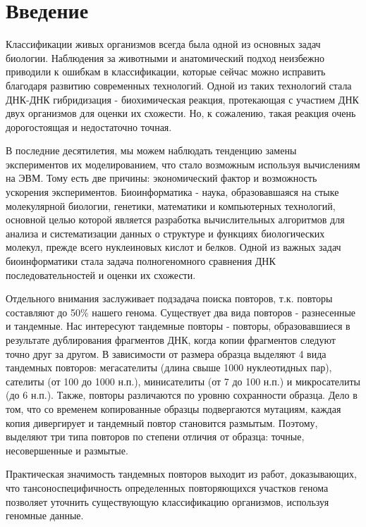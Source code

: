 \chapter*{Введение}							%

Классификации живых организмов всегда была одной из основных задач биологии.
Наблюдения за животными и анатомический подход неизбежно приводили к ошибкам
в классификации, которые сейчас можно исправить благодаря развитию современных
технологий. Одной из таких технологий стала ДНК-ДНК гибридизация - биохимическая реакция,
протекающая с участием ДНК двух организмов для оценки их схожести. Но, к сожалению,
такая реакция очень дорогостоящая и недостаточно точная.

В последние десятилетия, мы можем наблюдать тенденцию замены экспериментов
их моделированием, что стало возможным используя вычислениям на ЭВМ. Тому есть
две причины: экономический фактор и возможность ускорения экспериментов.
Биоинформатика - наука, образовавшаяся на стыке молекулярной биологии, генетики,
математики и компьютерных технологий, основной целью которой является разработка
вычислительных алгоритмов для анализа и систематизации данных о структуре и
функциях биологических молекул, прежде всего нуклеиновых кислот и белков.
Одной из важных задач биоинформатики стала задача полногеномного сравнения ДНК
последовательностей и оценки их схожести.

Отдельного внимания заслуживает подзадача поиска повторов, т.к. повторы составляют
до 50\% нашего генома. Существует два вида повторов - разнесенные и тандемные.
Нас интересуют тандемные повторы - повторы, образовавшиеся в результате дублирования
фрагментов ДНК, когда копии фрагментов следуют точно друг за другом.
В зависимости от размера образца выделяют 4 вида тандемных повторов: мегасателиты
(длина свыше 1000 нуклеотидных пар), сателиты (от 100 до 1000 н.п.), минисателиты
(от 7 до 100 н.п.) и микросателиты (до 6 н.п.). Также, повторы различаются
по уровню сохранности образца. Дело в том, что со временем копированные образцы 
подвергаются мутациям, каждая копия дивергирует и тандемный повтор становится
размытым. Поэтому, выделяют три типа повторов по степени отличия от образца:
точные, несовершенные и размытые.

Практическая значимость тандемных повторов выходит из работ, доказывающих, что
тансоноспецифичность определенных повторяющихся участков генома позволяет
уточнить существующую классификацию организмов, используя геномные данные.

